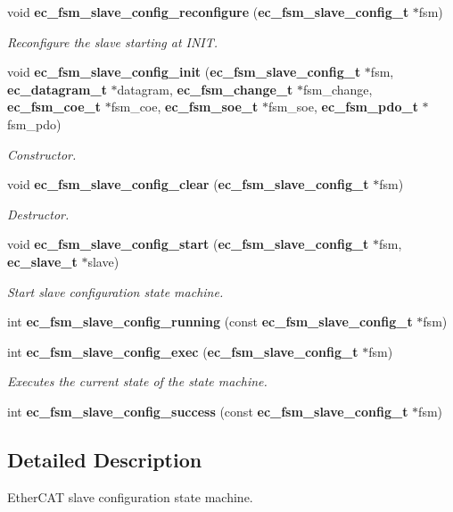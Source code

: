 \begin{DoxyCompactItemize}
void {\bf ec\-\_\-fsm\-\_\-slave\-\_\-config\-\_\-reconfigure} ({\bf ec\-\_\-fsm\-\_\-slave\-\_\-config\-\_\-t} $\ast$fsm)
\begin{DoxyCompactList}\small\item\em Reconfigure the slave starting at I\-N\-I\-T. \end{DoxyCompactList}\item 
void {\bf ec\-\_\-fsm\-\_\-slave\-\_\-config\-\_\-init} ({\bf ec\-\_\-fsm\-\_\-slave\-\_\-config\-\_\-t} $\ast$fsm, {\bf ec\-\_\-datagram\-\_\-t} $\ast$datagram, {\bf ec\-\_\-fsm\-\_\-change\-\_\-t} $\ast$fsm\-\_\-change, {\bf ec\-\_\-fsm\-\_\-coe\-\_\-t} $\ast$fsm\-\_\-coe, {\bf ec\-\_\-fsm\-\_\-soe\-\_\-t} $\ast$fsm\-\_\-soe, {\bf ec\-\_\-fsm\-\_\-pdo\-\_\-t} $\ast$fsm\-\_\-pdo)
\begin{DoxyCompactList}\small\item\em Constructor. \end{DoxyCompactList}\item 
void {\bf ec\-\_\-fsm\-\_\-slave\-\_\-config\-\_\-clear} ({\bf ec\-\_\-fsm\-\_\-slave\-\_\-config\-\_\-t} $\ast$fsm)
\begin{DoxyCompactList}\small\item\em Destructor. \end{DoxyCompactList}\item 
void {\bf ec\-\_\-fsm\-\_\-slave\-\_\-config\-\_\-start} ({\bf ec\-\_\-fsm\-\_\-slave\-\_\-config\-\_\-t} $\ast$fsm, {\bf ec\-\_\-slave\-\_\-t} $\ast$slave)
\begin{DoxyCompactList}\small\item\em Start slave configuration state machine. \end{DoxyCompactList}\item 
int {\bf ec\-\_\-fsm\-\_\-slave\-\_\-config\-\_\-running} (const {\bf ec\-\_\-fsm\-\_\-slave\-\_\-config\-\_\-t} $\ast$fsm)
\item 
int {\bf ec\-\_\-fsm\-\_\-slave\-\_\-config\-\_\-exec} ({\bf ec\-\_\-fsm\-\_\-slave\-\_\-config\-\_\-t} $\ast$fsm)
\begin{DoxyCompactList}\small\item\em Executes the current state of the state machine. \end{DoxyCompactList}\item 
int {\bf ec\-\_\-fsm\-\_\-slave\-\_\-config\-\_\-success} (const {\bf ec\-\_\-fsm\-\_\-slave\-\_\-config\-\_\-t} $\ast$fsm)
\end{DoxyCompactItemize}


\subsection{Detailed Description}
Ether\-C\-A\-T slave configuration state machine. 

